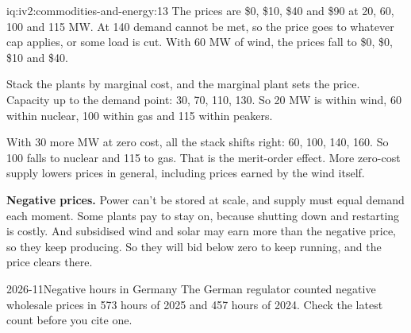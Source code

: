 \begin{solution}{iq:iv2:commodities-and-energy:13}
The prices are \$0, \$10, \$40 and \$90 at 20, 60, 100 and 115 MW. At 140 demand cannot be met, so the price goes to whatever cap applies, or some load is cut. With 60 MW of wind, the prices fall to \$0, \$0, \$10 and \$40.

Stack the plants by marginal cost, and the marginal plant sets the price. Capacity up to the demand point: 30, 70, 110, 130. So 20 MW is within wind, 60 within nuclear, 100 within gas and 115 within peakers.

With 30 more MW at zero cost, all the stack shifts right: 60, 100, 140, 160. So 100 falls to nuclear and 115 to gas. That is the merit-order effect. More zero-cost supply lowers prices in general, including prices earned by the wind itself.

\textbf{Negative prices.} Power can't be stored at scale, and supply must equal demand each moment. Some plants pay to stay on, because shutting down and restarting is costly. And subsidised wind and solar may earn more than the negative price, so they keep producing. So they will bid below zero to keep running, and the price clears there.

\begin{dated}{2026-11}{Negative hours in Germany}\label{dat:iv2:commodities-and-energy:neg}
The German regulator counted negative wholesale prices in 573 hours of 2025 and 457 hours of 2024. Check the latest count before you cite one.
\end{dated}

\end{solution}

